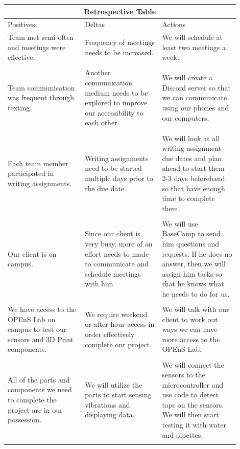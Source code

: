 \documentclass[letterpaper,10pt,draftclsnofoot,onecolumn]{article}
\begin{document}
\begin{center}
\begin{tabular}{ |p{0.3\linewidth}|p{0.3\linewidth}|p{0.3\linewidth}| }
\hline
\multicolumn{3}{|c|}{Retrospective Table} \\
\hline
Positives & Deltas & Actions \\
\hline
Team met semi-often and meetings were effective. & 
Frequency of meetings needs to be increased. & 
We will schedule at least two meetings a week. \\
 & & \\
Team communication was frequent through texting. & 
Another communication medium needs to be explored to improve our accessibility to each other. & 
We will create a Discord server so that we can communicate using our phones and our computers. \\
 & & \\
Each team member participated in writing assignments. & 
Writing assignments need to be started multiple days prior to the due date. & 
We will look at all writing assignment due dates and plan ahead to start them 2-3 days beforehand so that have enough time to complete them. \\
 & & \\
Our client is on campus. & 
Since our client is very busy, more of an effort needs to made to communicate and schedule meetings with him.  & 
We will use BaseCamp to send him questions and requests. If he does no answer, then we will assign him tasks so that he knows what he needs to do for us.  \\
 & & \\
We have access to the OPEnS Lab on campus to test our sensors and 3D Print components. & 
We require weekend or after-hour access in order effectively complete our project. & 
We will talk with our client to work out ways we can have more access to the OPEnS Lab.  \\
 & & \\
All of the parts and components we need to complete the project are in our possession. & 
We will utilize the parts to start sensing vibrations and displaying data. & 
We will connect the sensors to the microcontroller and use code to detect taps on the sensors. We will then start testing it with water and pipettes. \\
 & & \\
\hline
\end{tabular}
\end{center}

\pagebreak



\end{document}
